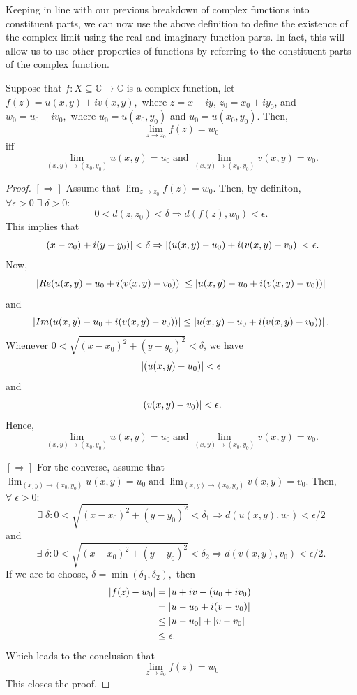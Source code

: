 \documentclass[12pt]{book}
\begin{document}
Keeping in line with our previous breakdown of complex functions into constituent parts, we can now use the above definition to define the existence of the complex limit using the real and imaginary function parts. In fact, this will allow us to use other properties of functions by referring to the constituent parts of the complex function.

\begin{thm}
    Suppose that $f: X \subseteq \mathbb{C} \rightarrow \mathbb{C}$ is a complex function, let $f(z) = u(x, y) + iv(x, y),$ where $z = x + iy$, $z_0 = x_0 + iy_0$, and $w_0 = u_0 + iv_0,$ where $u_0 = u(x_0, y_0)$ and $u_0 = u(x_0, y_0)$. Then, 
    $$
        \lim_{z \rightarrow z_0} f(z) = w_0
    $$ 
    iff 
    $$
        \lim_{(x, y) \rightarrow (x_0, y_0)} u(x, y) = u_0\; \text{and}\; \lim_{(x, y) \rightarrow (x_0, y_0)} v(x, y) = v_0.
    $$
\end{thm}
\begin{proof}
    $\mathbf{[\Rightarrow]}$ Assume that $\lim_{z \rightarrow z_0} f(z) = w_0.$ Then, by definiton, $\forall \epsilon > 0\; \exists\; \delta > 0:$
    $$
       0 < d(z, z_0) < \delta \Rightarrow d(f(z), w_0) < \epsilon.
    $$
    This implies that 
    $$
        \left\lvert (x - x_0) + i(y - y_0) \right\rvert < \delta \Rightarrow \left\lvert (u(x, y) - u_0) + i(v(x, y) - v_0) \right\rvert < \epsilon.
    $$
    Now, 
    $$
        \left\lvert Re(u(x, y) - u_0 + i(v(x, y) - v_0)) \right\rvert \leq \left\lvert u(x, y) - u_0 + i(v(x, y) - v_0)) \right\rvert
    $$
    and 
    $$
        \left\lvert Im(u(x, y) - u_0 + i(v(x, y) - v_0)) \right\rvert \leq \left\lvert u(x, y) - u_0 + i(v(x, y) - v_0)) \right\rvert.
    $$
    Whenever $0 < \sqrt{(x - x_0)^2 + (y - y_0)^2} < \delta$, we have
    $$
        \left\lvert (u(x, y) - u_0) \right\rvert < \epsilon
    $$
    and 
    $$
        \left\lvert (v(x, y) - v_0) \right\rvert < \epsilon.
    $$
    Hence,
    $$
        \lim_{(x, y) \rightarrow (x_0, y_0)} u(x, y) = u_0\; \text{and}\; \lim_{(x, y) \rightarrow (x_0, y_0)} v(x, y) = v_0.
    $$

    $\mathbf{[\Rightarrow]}$ For the converse, assume that $\lim_{(x, y) \rightarrow (x_0, y_0)} u(x, y) = u_0\; \text{and}\; \lim_{(x, y) \rightarrow (x_0, y_0)} v(x, y) = v_0.$ Then, $\forall\; \epsilon > 0$:
    $$
        \exists\; \delta: 0 < \sqrt{(x - x_0)^2 + (y - y_0)^2} < \delta_1 \Rightarrow d(u(x, y), u_0) < \epsilon / 2
    $$
    and
    $$
        \exists\; \delta: 0 < \sqrt{(x - x_0)^2 + (y - y_0)^2} < \delta_2 \Rightarrow d(v(x, y), v_0) < \epsilon / 2.
    $$ 
    If we are to choose, $\delta = \min(\delta_1, \delta_2),$ then 
    \begin{align*}
        \left\lvert f(z) - w_0 \right\rvert
            &=
                \left\lvert u + iv - (u_0 + iv_0) \right\rvert \\
            &= 
                \left\lvert u - u_0 + i(v - v_0) \right\rvert \\
            &\leq
                \left\lvert u - u_0 \right\rvert + \left\lvert v - v_0 \right\rvert \\
            &\leq
                \epsilon.
    \end{align*}
    Which leads to the conclusion that 
    $$
        \lim_{z \rightarrow z_0} f(z) = w_0
    $$
    This closes the proof.
\end{proof}
\end{document}
